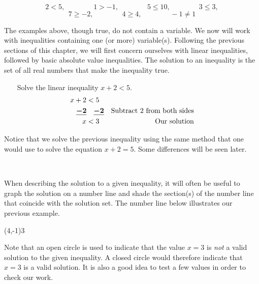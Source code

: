 \pagebreak

\begin{example}\label{Lin91}
	\
\end{example}
$$2<5, \qquad\qquad 1>-1, \qquad\qquad 5\leq 10, \qquad\qquad 3\leq 3,$$
$$7\geq-2, \qquad\qquad 4\geq 4, \qquad\qquad -1\neq 1$$

The examples above, though true, do not contain a variable.  We now will work with inequalities containing one (or more) variable(s).  Following the previous sections of this chapter, we will first concern ourselves with linear inequalities, followed by basic absolute value inequalities.  The solution to an inequality is the set of all real numbers that make the inequality true.\par

\begin{example}\label{Lin92}~~~ Solve the linear inequality  $x+2<5$. 
\begin{eqnarray*}
x+2<5~~ && \\
\boldsymbol{\underline{-2}~~~\underline{-2}} && \text{Subtract~} 2 \text{~from~both~sides} \\
x<3~~ && \text{Our~solution}
\end{eqnarray*}
\end{example}

Notice that we solve the previous inequality using the same method that one would use to solve the equation $x+2=5$.  Some differences will be seen later.\par
~\par
When describing the solution to a given inequality, it will often be useful to graph the solution on a number line and shade the section(s) of the number line that coincide with the solution set.  The number line below illustrates our previous example.%

\begin{center}
\begin{mfpic}[10]{-8}{8}{-2}{0.5}
\reverse \arrow {}
\tlpointsep{4pt}
\tlabel[cc](4,-1){$3$}
\penwd{2.3pt}
\arrow[b -5.8pt][l 6pt]
\end{mfpic} 
\end{center}

Note that an open circle is used to indicate that the value $x=3$ is \textit{not} a valid solution to the given inequality.  A closed circle would therefore indicate that $x=3$ is a valid solution.  It is also a good idea to test a few values in order to check our work.\par
~\par

